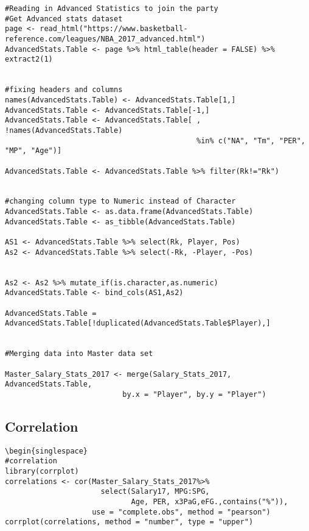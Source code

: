\documentclass{article}
\begin{document}
\begin{flushleft}
\begin{singlespace}
\begin{lstlisting}
#Reading in Advanced Statistics to join the party
#Get Advanced stats dataset
page <- read_html("https://www.basketball-reference.com/leagues/NBA_2017_advanced.html")
AdvancedStats.Table <- page %>% html_table(header = FALSE) %>% extract2(1)


#fixing headers and columns
names(AdvancedStats.Table) <- AdvancedStats.Table[1,]
AdvancedStats.Table <- AdvancedStats.Table[-1,]
AdvancedStats.Table <- AdvancedStats.Table[ , !names(AdvancedStats.Table) 
                                            %in% c("NA", "Tm", "PER", "MP", "Age")]

AdvancedStats.Table <- AdvancedStats.Table %>% filter(Rk!="Rk")


#changing column type to Numeric instead of Character
AdvancedStats.Table <- as.data.frame(AdvancedStats.Table)
AdvancedStats.Table <- as_tibble(AdvancedStats.Table)

AS1 <- AdvancedStats.Table %>% select(Rk, Player, Pos)
As2 <- AdvancedStats.Table %>% select(-Rk, -Player, -Pos)


As2 <- As2 %>% mutate_if(is.character,as.numeric)
AdvancedStats.Table <- bind_cols(AS1,As2)

AdvancedStats.Table = AdvancedStats.Table[!duplicated(AdvancedStats.Table$Player),]


#Merging data into Master data set

Master_Salary_Stats_2017 <- merge(Salary_Stats_2017, AdvancedStats.Table,
                           by.x = "Player", by.y = "Player")
\end{lstlisting}
\end{singlespace}
\subsection{Correlation}
\begin{lstlisting}
\begin{singlespace}
#correlation 
library(corrplot)
correlations <- cor(Master_Salary_Stats_2017%>%
                      select(Salary17, MPG:SPG,
                             Age, PER, x3PaG,eFG.,contains("%")),
                    use = "complete.obs", method = "pearson")
corrplot(correlations, method = "number", type = "upper")
       

\end{lstlisting}
\end{flushleft}
\end{document}

